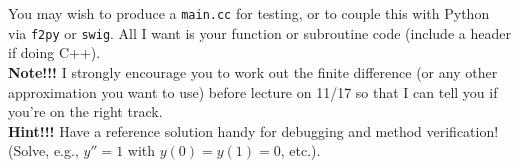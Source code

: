 \documentclass[11pt]{article}
\begin{document}
You may wish to produce a {\tt main.cc} for testing, or to couple this
with Python via {\tt f2py} or {\tt swig}.  All I want is your function
or subroutine code (include a header if doing C++).\\

{\bf Note!!!} I strongly encourage you to work out the finite difference 
(or any other approximation you want to use) before lecture on 11/17 so that
I can tell you if you're on the right track.\\

{\bf Hint!!!} Have a reference solution handy for debugging and method
verification!  (Solve, e.g., $y'' = 1$ with $y(0) = y(1) = 0$, etc.).
\end{document}
